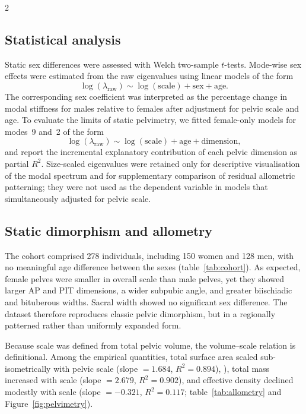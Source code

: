 \documentclass[openacc]{rsproca_new}
\begin{document}
\begin{multicols}{2}
\subsection{Statistical analysis}

Static sex differences were assessed with Welch two-sample $t$-tests. Mode-wise sex effects were estimated from the raw eigenvalues using linear models of the form
\begin{equation}
\log(\lambda_{\mathrm{raw}}) \sim \log(\mathrm{scale}) + \mathrm{sex} + \mathrm{age}.
\end{equation}
The corresponding sex coefficient was interpreted as the percentage change in modal stiffness for males relative to females after adjustment for pelvic scale and age. To evaluate the limits of static pelvimetry, we fitted female-only models for modes~9 and~2 of the form
\begin{equation}
\log(\lambda_{\mathrm{raw}}) \sim \log(\mathrm{scale}) + \mathrm{age} + \mathrm{dimension},
\end{equation}
and report the incremental explanatory contribution of each pelvic dimension as partial $R^2$. Size-scaled eigenvalues were retained only for descriptive visualisation of the modal spectrum and for supplementary comparison of residual allometric patterning; they were not used as the dependent variable in models that simultaneously adjusted for pelvic scale.

\subsection{Static dimorphism and allometry}

The cohort comprised 278 individuals, including 150 women and 128 men, with no meaningful age difference between the sexes (table~\ref{tab:cohort}). As expected, female pelves were smaller in overall scale than male pelves, yet they showed larger AP and PIT dimensions, a wider subpubic angle, and greater biischiadic and bituberous widths. Sacral width showed no significant sex difference. The dataset therefore reproduces classic pelvic dimorphism, but in a regionally patterned rather than uniformly expanded form.

Because scale was defined from total pelvic volume, the volume–scale relation is definitional. Among the empirical quantities, total surface area scaled sub-isometrically with pelvic scale (slope $=1.684$, $R^2=0.894$), ), total mass increased with scale (slope $=2.679$, $R^2=0.902$), and effective density
declined modestly with scale (slope $=-0.321$, $R^2=0.117$; table~\ref{tab:allometry} and Figure~\ref{fig:pelvimetry}).


\end{multicols}
\end{document}
